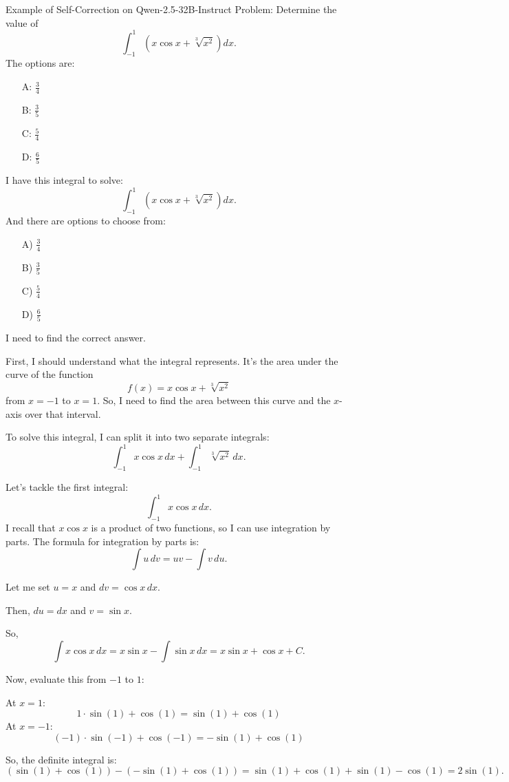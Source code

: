 \begin{promptbox}{Example of Self-Correction on Qwen-2.5-32B-Instruct}
Problem: Determine the value of 
\[
\int_{-1}^{1}\left(x\cos x+\sqrt[3]{{{x}^{2}}}\right)dx.
\]
The options are:
\begin{itemize}
    \item[A:] $\frac{3}{4}$
    \item[B:] $\frac{3}{5}$
    \item[C:] $\frac{5}{4}$
    \item[D:] $\frac{6}{5}$
\end{itemize}

I have this integral to solve:
\[
\int_{-1}^{1} \left( x \cos x + \sqrt[3]{x^2} \right) dx.
\]
And there are options to choose from: 
\begin{itemize}
    \item[A)] $\frac{3}{4}$
    \item[B)] $\frac{3}{5}$
    \item[C)] $\frac{5}{4}$
    \item[D)] $\frac{6}{5}$
\end{itemize}

I need to find the correct answer.

First, I should understand what the integral represents. It's the area under the curve of the function 
\[
f(x) = x \cos x + \sqrt[3]{x^2}
\]
from $x = -1$ to $x = 1$. So, I need to find the area between this curve and the $x$-axis over that interval.

To solve this integral, I can split it into two separate integrals:
\[
\int_{-1}^{1} x \cos x \,dx + \int_{-1}^{1} \sqrt[3]{x^2} \,dx.
\]

Let's tackle the first integral:
\[
\int_{-1}^{1} x \cos x \,dx.
\]
I recall that $x \cos x$ is a product of two functions, so I can use integration by parts. The formula for integration by parts is:
\[
\int u \, dv = uv - \int v \, du.
\]

Let me set $u = x$ and $dv = \cos x \,dx$.

Then, $du = dx$ and $v = \sin x$.

So,
\[
\int x \cos x \,dx = x \sin x - \int \sin x \,dx = x \sin x + \cos x + C.
\]

Now, evaluate this from $-1$ to $1$:

At $x = 1$: 
\[
1 \cdot \sin(1) + \cos(1) = \sin(1) + \cos(1)
\]
At $x = -1$: 
\[
(-1) \cdot \sin(-1) + \cos(-1) = -\sin(1) + \cos(1)
\]

So, the definite integral is:
\[
(\sin(1) + \cos(1)) - (-\sin(1) + \cos(1)) = \sin(1) + \cos(1) + \sin(1) - \cos(1) = 2 \sin(1).
\]


\end{promptbox}
